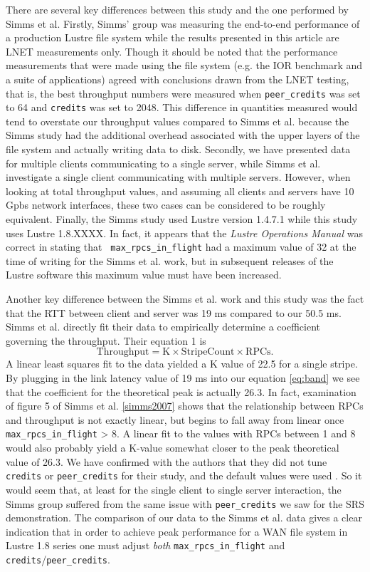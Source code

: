 \documentclass[]{sigplan-proc}
\begin{document}
There are several key differences between this study and the one performed by Simms et al. Firstly, Simms'
group was measuring the end-to-end performance of a production Lustre file system while the results presented
in this article are LNET measurements only. Though it should be noted that the performance measurements that
were made using the file system (e.g. the IOR benchmark and a suite of applications) agreed with conclusions
drawn from the LNET testing, that is, the best throughput numbers were measured when {\tt peer\_credits} was
set to 64 and {\tt credits} was set to 2048. This difference in quantities measured would tend to overstate
our throughput values compared to Simms et al. because the Simms study had the additional overhead associated
with the upper layers of the file system and actually writing data to disk. Secondly, we have presented data
for multiple clients communicating to a single server, while Simms et al. investigate a single client
communicating with multiple servers. However, when looking at total throughput values, and assuming all
clients and servers have 10 Gpbs network interfaces, these two cases can be considered to be roughly
equivalent. Finally, the Simms study used Lustre version 1.4.7.1 while this study uses Lustre 1.8.XXXX. In
fact, it appears that the {\it Lustre Operations Manual} was correct in stating that {\tt
  max\_rpcs\_in\_flight} had a maximum value of 32 at the time of writing for the Simms et al. work, but in
subsequent releases of the Lustre software this maximum value must have been increased.

Another key difference between the Simms et al. work and this study was the fact
that the RTT between client and server was 19 ms compared to our 50.5 ms. Simms et al. directly fit their data
to empirically determine a coefficient governing the throughput. Their equation 1 is
\begin{equation}
\mathrm{Throughput = K \times Stripe Count \times RPCs.}
\end{equation}
A linear least squares fit to the data yielded a K value of 22.5 for a single stripe. By plugging in the link
latency value of 19 ms into our equation \ref{eq:band} we see that the coefficient for the theoretical peak is
actually 26.3. In fact, examination of figure 5 of Simms et al. \ref{simms2007} shows that the relationship
between RPCs and throughput is not exactly linear, but begins to fall away from linear once {\tt
  max\_rpcs\_in\_flight} > 8. A linear fit to the values with RPCs between 1 and 8 would also probably yield a
K-value somewhat closer to the peak theoretical value of 26.3. We have confirmed with the authors that they
did not tune {\tt credits} or {\tt peer\_credits} for their study, and the default values were used
\cite{simmsprivate}. So it would seem that, at least for the single client to single server interaction, the
Simms group suffered from the same issue with {\tt peer\_credits} we saw for the SRS demonstration. The
comparison of our data to the Simms et al. data gives a clear indication that in order to achieve peak
performance for a WAN file system in Lustre 1.8 series one must adjust {\it both} {\tt max\_rpcs\_in\_flight}
and {\tt credits}/{\tt peer\_credits}.
\end{document}
